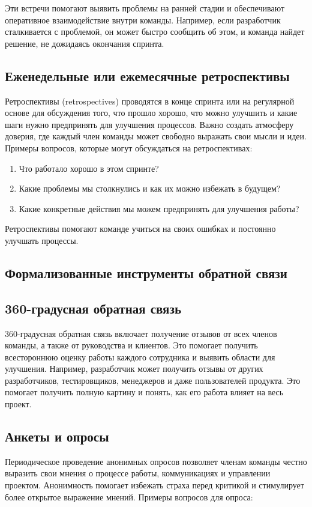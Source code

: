     Эти встречи помогают выявить проблемы на ранней стадии и обеспечивают оперативное взаимодействие внутри команды. Например, если разработчик сталкивается с проблемой, он может быстро сообщить об этом, и команда найдет решение, не дожидаясь окончания спринта.

    \subsection*{Еженедельные или ежемесячные ретроспективы}
    Ретроспективы (retrospectives) проводятся в конце спринта или на регулярной основе для обсуждения того, что прошло хорошо, что можно улучшить и какие шаги нужно предпринять для улучшения процессов. Важно создать атмосферу доверия, где каждый член команды может свободно выражать свои мысли и идеи. Примеры вопросов, которые могут обсуждаться на ретроспективах:

    \begin{enumerate}
        \item 	Что работало хорошо в этом спринте?
        \item 	Какие проблемы мы столкнулись и как их можно избежать в будущем?
        \item 	Какие конкретные действия мы можем предпринять для улучшения работы?
    \end{enumerate}
    
    Ретроспективы помогают команде учиться на своих ошибках и постоянно улучшать процессы.

    \subsection*{Формализованные инструменты обратной связи}

    \subsection*{360-градусная обратная связь}
    360-градусная обратная связь включает получение отзывов от всех членов команды, а также от руководства и клиентов. Это помогает получить всестороннюю оценку работы каждого сотрудника и выявить области для улучшения. Например, разработчик может получить отзывы от других разработчиков, тестировщиков, менеджеров и даже пользователей продукта. Это помогает получить полную картину и понять, как его работа влияет на весь проект.

    \subsection*{Анкеты и опросы}
    Периодическое проведение анонимных опросов позволяет членам команды честно выразить свои мнения о процессе работы, коммуникациях и управлении проектом. Анонимность помогает избежать страха перед критикой и стимулирует более открытое выражение мнений. Примеры вопросов для опроса:
    
